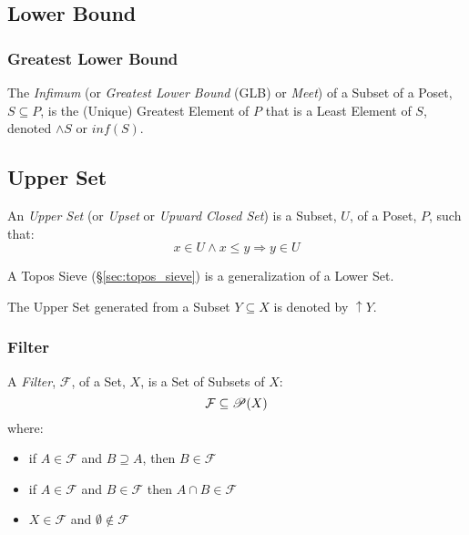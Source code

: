 \subsection{Lower Bound}\label{sec:lower_bound}

\subsubsection{Greatest Lower Bound}\label{sec:greatest_lowerbound}

The \emph{Infimum} (or \emph{Greatest Lower Bound} (GLB) or
\emph{Meet}) of a Subset of a Poset, $S \subseteq P$, is the (Unique)
Greatest Element of $P$ that is a Least Element of $S$, denoted
$\wedge S$ or $inf (S)$.



\subsection{Upper Set}\label{sec:upper_set}

An \emph{Upper Set} (or \emph{Upset} or \emph{Upward Closed Set}) is a
Subset, $U$, of a Poset, $P$, such that:
\[
  x \in U \wedge x \leq y \Rightarrow y \in U
\]

A Topos Sieve (\S\ref{sec:topos_sieve}) is a generalization of a Lower
Set.

The Upper Set generated from a Subset $Y \subseteq X$ is denoted by
$\uparrow Y$.



\subsubsection{Filter}\label{sec:filter}

A \emph{Filter}, $\mathcal{F}$, of a Set, $X$, is a Set of Subsets of
$X$:
\[
  \mathcal{F} \subseteq \mathscr{P}(X)
\]
where:
\begin{itemize}
\item if $A \in \mathcal{F}$ and $B \supseteq A$, then $B \in
  \mathcal{F}$
\item if $A \in \mathcal{F}$ and $B \in \mathcal{F}$ then $A \cap B
  \in \mathcal{F}$
\item $X \in \mathcal{F}$ and $\emptyset \notin \mathcal{F}$
\end{itemize}


